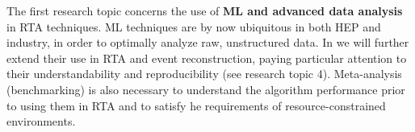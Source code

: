 
The first research topic concerns the use of \textbf{ML and advanced data analysis} in RTA techniques.
ML techniques are by now ubiquitous in both HEP and industry, in order to optimally analyze raw, unstructured data. 
In \acronym we will further extend their use in RTA and event reconstruction, paying particular attention to their understandability and reproducibility (see research topic 4).   
Meta-analysis (benchmarking) is also necessary to understand the algorithm performance prior to using them in RTA and to satisfy he requirements of resource-constrained environments.

\begin{center}
\vskip-15pt
\end{center}

